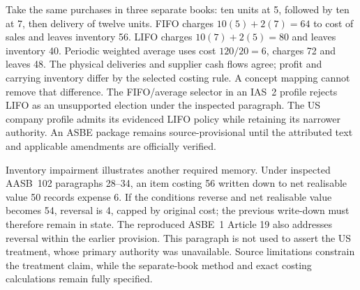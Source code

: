 Take the same purchases in three separate books: ten units at 5, followed by
ten at 7, then delivery of twelve units. FIFO charges $10(5)+2(7)=64$ to
cost of sales and leaves inventory 56. LIFO charges $10(7)+2(5)=80$ and
leaves inventory 40. Periodic weighted average uses cost $120/20=6$, charges
72 and leaves 48. The physical deliveries and supplier cash flows agree;
profit and carrying inventory differ by the selected costing rule. A concept
mapping cannot remove that difference. The FIFO/average selector in an
IAS~2 profile rejects LIFO as an unsupported election under the inspected
paragraph. The US company profile admits its evidenced LIFO policy while
retaining its narrower authority. An ASBE package remains source-provisional
until the attributed text and applicable amendments are officially verified.

Inventory impairment illustrates another required memory. Under inspected
AASB~102 paragraphs 28--34, an item costing 56 written down to net realisable
value 50 records expense 6. If the conditions reverse and net realisable
value becomes 54, reversal is 4, capped by original cost; the previous
write-down must therefore remain in state. The reproduced ASBE~1 Article 19
also addresses reversal within the earlier provision. This paragraph is not
used to assert the US treatment, whose primary authority was unavailable.
Source limitations constrain the treatment claim, while the separate-book
method and exact costing calculations remain fully specified.







